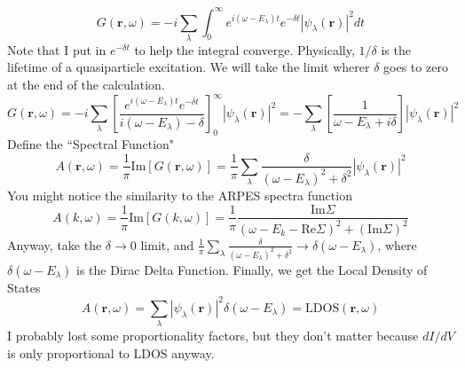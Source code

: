 \documentclass[a4paper,12pt]{article}
\renewcommand{\vec}[1]{\boldsymbol{\mathbf{#1}}}
\begin{document}
\begin{equation}
G(\vec{r},\omega) = -i \sum\limits_{\lambda} \int^\infty_0 e^{i (\omega - E_\lambda) t} e^{-\delta t} |\psi_\lambda(\vec{r})|^2 dt
\end{equation}
Note that I put in $e^{-\delta t}$ to help the integral converge.  Physically, $1/\delta$ is the lifetime of a quasiparticle excitation.  We will take the limit wherer $\delta$ goes to zero at the end of the calculation.
\begin{equation}
G(\vec{r},\omega) = -i \sum\limits_{\lambda} \left[ \frac{e^{i (\omega - E_\lambda) t} e^{-\delta t}}{i(\omega-E_\lambda)-\delta} \right]_0^\infty | \psi_\lambda(\vec{r})|^2 = - \sum\limits_{\lambda} \left[ \frac{1}{\omega-E_\lambda+i\delta} \right] |\psi_\lambda(\vec{r})|^2
\end{equation}
Define the ``Spectral Function"
\begin{equation}
A(\vec{r},\omega)=\frac{1}{\pi} \text{Im}[G(\vec{r},\omega)] = \frac{1}{\pi} \sum\limits_{\lambda} \frac{\delta}{(\omega-E_\lambda)^2+\delta^2} |\psi_\lambda(\vec{r})|^2
\end{equation}
You might notice the similarity to the ARPES spectra function
\begin{equation}
A(k,\omega)=\frac{1}{\pi} \text{Im}[G(k,\omega)] = \frac{1}{\pi} \frac{\text{Im}\Sigma}{(\omega-E_k-\text{Re}\Sigma)^2+(\text{Im}\Sigma)^2}
\end{equation}
Anyway, take the $\delta \rightarrow 0$ limit, and $\frac{1}{\pi} \sum\limits_{\lambda} \frac{\delta}{(\omega-E_\lambda)^2+\delta^2} \rightarrow \delta(\omega - E_\lambda)$, where $\delta(\omega - E_\lambda)$ is the Dirac Delta Function.  Finally, we get the Local Density of States
\begin{equation}
A(\vec{r},\omega) = \sum\limits_{\lambda} |\psi_\lambda(\vec{r})|^2 \delta(\omega - E_\lambda) = \text{LDOS}(\vec{r},\omega)
\end{equation}
I probably lost some proportionality factors, but they don't matter because $dI/dV$ is only proportional to LDOS anyway.
\end{document}
